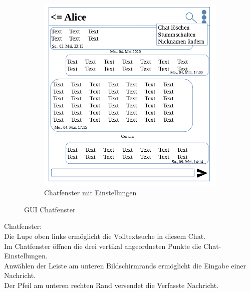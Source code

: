 \begin{figure}[h]
\begin{subfigure}{.5\textwidth}
  \includegraphics[scale=0.3]{gui/Chatfenster_mit_Einstellungen.png}
  \caption{Chatfenster mit Einstellungen}
\end{subfigure}
\caption{GUI Chatfenster}
\end{figure}

Chatfenster:\\
Die Lupe oben links ermöglicht die Volltextsuche in diesem Chat.\\
Im Chatfenster öffnen die drei vertikal angeordneten Punkte die Chat-Einstellungen.\\
Anwählen der Leiste am unteren Bildschirmrands ermöglicht die Eingabe einer Nachricht.\\
Der Pfeil am unteren rechten Rand versendet die Verfasste Nachricht.\\

\newpage

